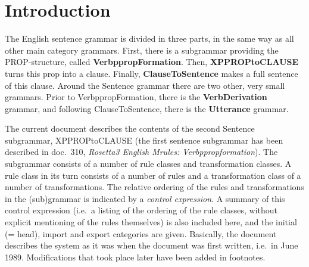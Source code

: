 

   \RosSupersedes{-}
   \MakeRosTitle
%
%

\section{Introduction}
The English sentence grammar is divided in three parts, in the same way as all
other main category grammars. First, there is a subgrammar providing the 
PROP-structure, 
called {\bf VerbppropFormation}. Then, {\bf XPPROPtoCLAUSE} turns this prop
into a clause. Finally, {\bf ClauseToSentence} makes a full sentence of this
clause. Around the Sentence grammar there are two other, very small grammars.
Prior to VerbppropFormation, there is the {\bf VerbDerivation} grammar, and
following ClauseToSentence, there is the {\bf Utterance} grammar.

The current document describes the contents of 
the second Sentence subgrammar, XPPROPtoCLAUSE (the first sentence subgrammar 
has been described in doc.\ 310, {\em Rosetta3 English Mrules: 
Verbppropformation\/}). The subgrammar consists of 
a number of rule classes and transformation classes. A rule class in its turn
consists of a number of rules and a transformation class of a number of 
transformations. The relative ordering of the rules and transformations in the
(sub)grammar is indicated by a {\em control expression}. A summary of this
control expression (i.e.\ a listing of the ordering of the rule classes, 
without explicit mentioning of the rules themselves) is also included here, 
and the initial (= head), import and export categories are given. Basically, 
the document describes the system as it was when the document was first 
written, i.e.\ in June 1989. Modifications that took place later have been 
added in footnotes.

